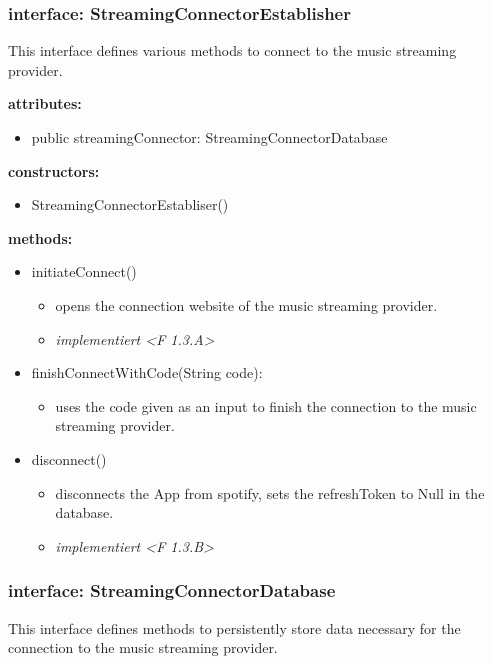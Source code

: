 \documentclass[oneside, ngerman]{sdqtechreport}
\begin{document}
\subsubsection{interface: StreamingConnectorEstablisher}
This interface defines various methods to connect to the music streaming provider.

\textbf{attributes:}
\begin{itemize}
    \item public streamingConnector: StreamingConnectorDatabase
\end{itemize}
\textbf{constructors:}
\begin{itemize}
    \item StreamingConnectorEstabliser()
\end{itemize}
\textbf{methods:}
\begin{itemize}
    \item initiateConnect()
    \begin{itemize}
        \item opens the connection website of the music streaming provider.
        \item \textit{implementiert <F 1.3.A>}
    \end{itemize}
    \item finishConnectWithCode(String code):
    \begin{itemize}
        \item uses the code given as an input to finish the connection to the music streaming provider.
    \end{itemize}
    \item disconnect()
    \begin{itemize}
        \item disconnects the App from spotify, sets the refreshToken to Null in the database.
        \item \textit{implementiert <F 1.3.B>}
    \end{itemize}
\end{itemize}

\subsubsection{interface: StreamingConnectorDatabase}
This interface defines methods to persistently store data necessary for the connection to the music streaming provider.
\end{document}
